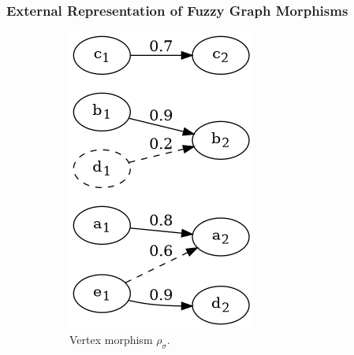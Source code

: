 \begin{frame}
	\frametitle{External Representation of Fuzzy Graph Morphisms}

	\begin{figure}[htbp]
		\centering
		\begin{subfigure}[t]{0.20\textwidth}
			\centering
			\includegraphics[width=\linewidth,valign=t]{inc/fuzzy_graph_theory/fuzzy_graph_morphism_external_rho_sigma.png}
			\caption{Vertex morphism $\rho_{\sigma}$.}
		\end{subfigure}
		\quad
		\begin{subfigure}[t]{0.20\textwidth}
			\centering

\end{subfigure}
\end{figure}
\end{frame}
